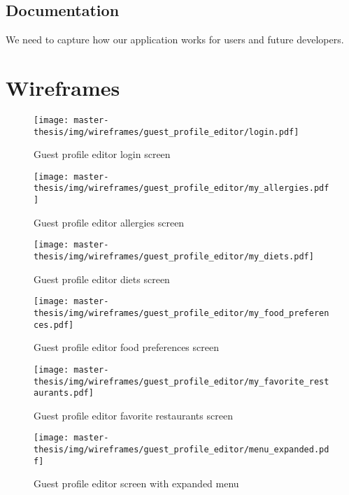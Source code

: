 \subsection{Documentation}
We need to capture how our application works for users and future developers.

\section{Wireframes}
\begin{figure}[h]
  \centering
  \texttt{[image: master-thesis/img/wireframes/guest\_profile\_editor/login.pdf]}
  \caption{Guest profile editor login screen}
\end{figure}

\begin{figure}[h]
  \centering
  \texttt{[image: master-thesis/img/wireframes/guest\_profile\_editor/my\_allergies.pdf]}
  \caption{Guest profile editor allergies screen}
\end{figure}

\begin{figure}[h]
  \centering
  \texttt{[image: master-thesis/img/wireframes/guest\_profile\_editor/my\_diets.pdf]}
  \caption{Guest profile editor diets screen}
\end{figure}

\begin{figure}[h]
  \centering
  \texttt{[image: master-thesis/img/wireframes/guest\_profile\_editor/my\_food\_preferences.pdf]}
  \caption{Guest profile editor food preferences screen}
\end{figure}

\begin{figure}[h]
  \centering
  \texttt{[image: master-thesis/img/wireframes/guest\_profile\_editor/my\_favorite\_restaurants.pdf]}
  \caption{Guest profile editor favorite restaurants screen}
\end{figure}

\begin{figure}[h]
  \centering
  \texttt{[image: master-thesis/img/wireframes/guest\_profile\_editor/menu\_expanded.pdf]}
  \caption{Guest profile editor screen with expanded menu}
\end{figure}

\listoftodos